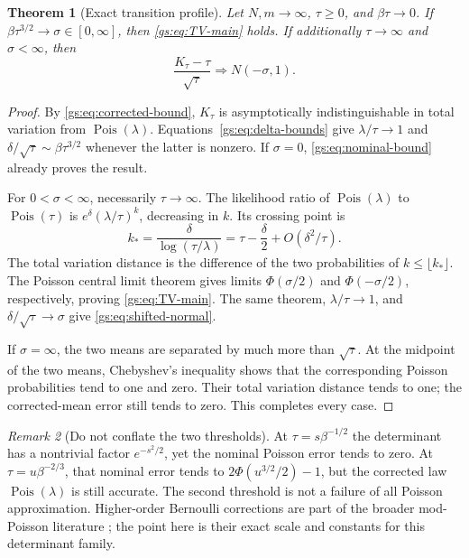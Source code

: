 \documentclass[11pt,a4paper]{article}
\numberwithin{equation}{section}
\newtheorem{theorem}{Theorem}[section]
\theoremstyle{definition}
\theoremstyle{remark}
\newtheorem{remark}[theorem]{Remark}
\newcommand{\Pois}{\operatorname{Pois}}
\begin{document}
\begin{theorem}[Exact transition profile]\label{gs:thm:TV-transition}
Let $N,m\to\infty$, $\tau\ge0$, and $\beta\tau\to0$.
If $\beta\tau^{3/2}\to\sigma\in[0,\infty]$, then
\eqref{gs:eq:TV-main} holds. If additionally $\tau\to\infty$ and
$\sigma<\infty$, then
\begin{equation}\label{gs:eq:shifted-normal}
 \frac{K_\tau-\tau}{\sqrt\tau}\Longrightarrow N(-\sigma,1).
\end{equation}
\end{theorem}
\begin{proof}
By \eqref{gs:eq:corrected-bound}, $K_\tau$ is asymptotically indistinguishable
in total variation from $\Pois(\lambda)$. Equations~\eqref{gs:eq:delta-bounds}
give $\lambda/\tau\to1$ and
$\delta/\sqrt\tau\sim\beta\tau^{3/2}$ whenever the latter is nonzero.
If $\sigma=0$, \eqref{gs:eq:nominal-bound} already proves the result.

For $0<\sigma<\infty$, necessarily $\tau\to\infty$.
The likelihood ratio of $\Pois(\lambda)$ to $\Pois(\tau)$ is
$e^\delta(\lambda/\tau)^k$, decreasing in $k$. Its crossing point is
\[
 k_*=\frac{\delta}{\log(\tau/\lambda)}
     =\tau-\frac\delta2+O(\delta^2/\tau).
\]
The total variation distance is the difference of the two probabilities
of $k\le\lfloor k_*\rfloor$. The Poisson central limit theorem gives
limits $\Phi(\sigma/2)$ and $\Phi(-\sigma/2)$, respectively, proving
\eqref{gs:eq:TV-main}. The same theorem, $\lambda/\tau\to1$, and
$\delta/\sqrt\tau\to\sigma$ give \eqref{gs:eq:shifted-normal}.

If $\sigma=\infty$, the two means are separated by much more than
$\sqrt\tau$. At the midpoint of the two means, Chebyshev's inequality
shows that the corresponding Poisson probabilities tend to one and zero.
Their total variation distance tends to one; the corrected-mean error
still tends to zero. This completes every case.
\end{proof}

\begin{remark}[Do not conflate the two thresholds]
At $\tau=s\beta^{-1/2}$ the determinant has a nontrivial factor
$e^{-s^2/2}$, yet the nominal Poisson error tends to zero.
At $\tau=u\beta^{-2/3}$, that nominal error tends to
$2\Phi(u^{3/2}/2)-1$, but the corrected law $\Pois(\lambda)$ is still
accurate. The second threshold is not a failure of all Poisson
approximation. Higher-order Bernoulli corrections are part of the broader
mod-Poisson literature \cite{MeliotNikeghbaliVisentin2022}; the point here is their exact scale
and constants for this determinant family.
\end{remark}
\end{document}
